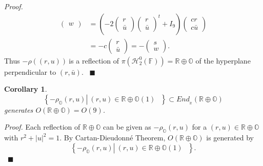 \documentclass[a4paper]{article}%
\newtheorem{corollary}[theorem]{Corollary}
\newenvironment{proof}[1][Proof]{\noindent\textit{#1.} }{}
\begin{document}
\begin{proof}
\begin{align*}
\begin{pmatrix}
w
\end{pmatrix}
&  =\left(  -2%
\begin{pmatrix}
r\\
\bar{u}%
\end{pmatrix}%
\begin{pmatrix}
r\\
\bar{u}%
\end{pmatrix}
^{t}+I_{9}\right)
\begin{pmatrix}
cr\\
c\bar{u}%
\end{pmatrix}
\\
&  =-c%
\begin{pmatrix}
r\\
\bar{u}%
\end{pmatrix}
=-%
\begin{pmatrix}
s\\
w
\end{pmatrix}
\text{.}%
\end{align*}
Thus $-\rho\left(  \left(  r,u\right)  \right)  \ $is a reflection of
$\pi\left(  \mathcal{H}_{2}^{0}(\mathbb{F})\right)  =\mathbb{R\oplus O}$ of
the hyperplane perpendicular to $\left(  r,\bar{u}\right)  $. \ $\blacksquare$
\end{proof}

\begin{corollary}
\label{OctRecCoro}
\[
\left\{  \left.  -\rho_{\mathbb{O}}\left(  r,u\right)  \right\vert \ \left(
r,u\right)  \in\mathbb{R\oplus O}\left(  1\right)  \text{ }\right\}  \subset
End_{_{\mathbb{R}}}\left(  \mathbb{R\oplus O}\right)
\]
generates $O\left(  \mathbb{R\oplus O}\right)  =O\left(  9\right)  $.
\end{corollary}

\begin{proof}
Each reflection of $\mathbb{R\oplus O}$ can be given as $-\rho_{\mathbb{O}%
}\left(  r,u\right)  $ for a $\left(  r,u\right)  \in\mathbb{R\oplus O}$ with
$r^{2}+\left\vert u\right\vert ^{2}=1$. By Cartan-Dieudonn\'{e} Theorem,
$O\left(  \mathbb{R\oplus O}\right)  $ is generated by%
\[
\left\{  \left.  -\rho_{\mathbb{O}}\left(  r,u\right)  \right\vert \ \left(
r,u\right)  \in\mathbb{R\oplus O}\left(  1\right)  \text{ }\right\}  \text{.}%
\]
\ $\blacksquare$ $\mathbb{\ }$
\end{proof}
\end{document}
